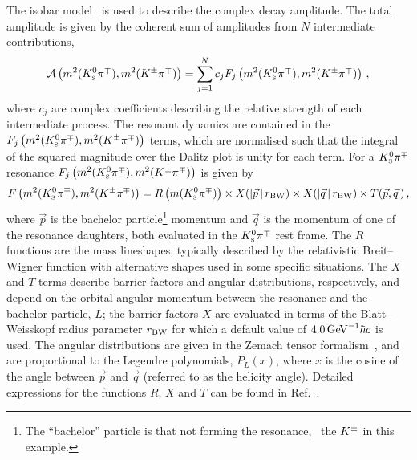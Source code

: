 The isobar model~\cite{Fleming:1964zz,Morgan:1968zza,Herndon:1973yn} is used to describe the complex decay amplitude. 
The total amplitude is given by the coherent sum of amplitudes from $N$ intermediate contributions,
\begin{equation}\label{eqn:amp}
  {\cal A}\left(m^2({{K}^0_{\mathrm{ \scriptscriptstyle S}}}{{\pi}^\mp}), m^2({{K}^\pm}{{\pi}^\mp})\right) = \sum_{j=1}^{N} c_j F_j\left(m^2({{K}^0_{\mathrm{ \scriptscriptstyle S}}}{{\pi}^\mp}), m^2({{K}^\pm}{{\pi}^\mp})\right) \,,
\end{equation}
where $c_j$ are complex coefficients describing the relative strength of each intermediate process. 
The resonant dynamics are contained in the $F_j\left(m^2({{K}^0_{\mathrm{ \scriptscriptstyle S}}}{{\pi}^\mp}),m^2({{K}^\pm}{{\pi}^\mp})\right)$ terms, which are normalised such that the integral of the squared magnitude over the Dalitz plot is unity for each term.
For a ${{K}^0_{\mathrm{ \scriptscriptstyle S}}}{{\pi}^\mp}$ resonance $F_j\left(m^2({{K}^0_{\mathrm{ \scriptscriptstyle S}}}{{\pi}^\mp}),m^2({{K}^\pm}{{\pi}^\mp})\right)$ is given by
\begin{equation}
  \label{eq:ResDynEqn}
  F\left(m^2({{K}^0_{\mathrm{ \scriptscriptstyle S}}}{{\pi}^\mp}), m^2({{K}^\pm}{{\pi}^\mp})\right) = 
  R\left(m({{K}^0_{\mathrm{ \scriptscriptstyle S}}}{{\pi}^\mp})\right) \times X(|\vec{p}\,|\,r_{\rm BW}) \times X(|\vec{q}\,|\,r_{\rm BW}) 
  \times T(\vec{p},\vec{q}\,) \, ,
\end{equation}
where $\vec{p}$ is the bachelor particle\footnote{
  The ``bachelor'' particle is that not forming the resonance, \ie\ the ${{K}^\pm}$ in this example.} momentum and $\vec{q}$ is the momentum of one of the resonance daughters, both evaluated in the ${{K}^0_{\mathrm{ \scriptscriptstyle S}}}{{\pi}^\mp}$ rest frame.
The $R$ functions are the mass lineshapes, typically described by the relativistic Breit--Wigner function with alternative shapes used in some specific situations.
The $X$ and $T$ terms describe barrier factors and angular distributions, respectively, and depend on the orbital angular momentum between the resonance and the bachelor particle, $L$;
the barrier factors $X$ are evaluated in terms of the Blatt--Weisskopf radius parameter $r_{\rm BW}$ for which a default value of $4.0 \mathrm{\,Ge\kern -0.1em V}^{-1}\hbar c$ is used.
The angular distributions are given in the Zemach tensor formalism~\cite{Zemach:1963bc,Zemach:1968zz}, and are proportional to the Legendre polynomials, $P_L(x)$, where $x$ is the cosine of the angle between $\vec{p}$ and $\vec{q}$ (referred to as the helicity angle). 
Detailed expressions for the functions $R$, $X$ and $T$ can be found in Ref.~\cite{Laura++}.

